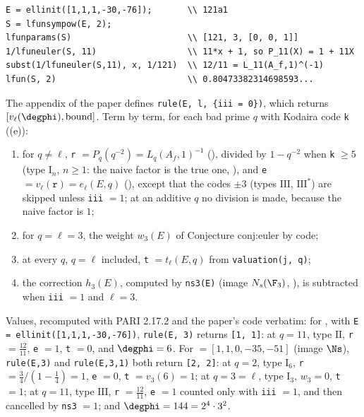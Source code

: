 \begin{lstlisting}[language=GP]
E = ellinit([1,1,1,-30,-76]);       \\ 121a1
S = lfunsympow(E, 2);
lfunparams(S)                       \\ [121, 3, [0, 0, 1]]
1/lfuneuler(S, 11)                  \\ 11*x + 1, so P_11(X) = 1 + 11X
subst(1/lfuneuler(S,11), x, 1/121)  \\ 12/11 = L_11(A_f,1)^(-1)
lfun(S, 2)                          \\ 0.80473382314698593...
\end{lstlisting}

\begin{example}\label{ex:lfunctions:rule}
The appendix of the paper defines \texttt{rule(E, l, \{iii = 0\})}, which returns $[v_\ell(\degphi),\text{bound}]$. Term by term, for each bad prime $q$ with Kodaira code \texttt{k}
((e)):
\begin{enumerate}[label=(\alph*)]
\item for $q\ne\ell$, \texttt{r} $=P_q(q^{-2})=L_q(A_f,1)^{-1}$ (), divided by $1-q^{-2}$ when \texttt{k} $\ge5$ (type $\mathrm I_n$, $n\ge1$: the naive factor is the true one,
), and \texttt{e} $=v_\ell(\texttt r)=e_\ell(E,q)$ (), except that the codes $\pm3$ (types $\mathrm{III}$, $\mathrm{III}^*$) are
skipped unless \texttt{iii} $=1$; at an additive $q$ no division is made, because the naive factor is $1$;
\item for $q=\ell=3$, the weight $w_3(E)$ of Conjecture conj:euler by code;
\item at every $q$, $q=\ell$ included, \texttt{t} $=t_\ell(E,q)$ from \texttt{valuation(j, q)};
\item the correction $h_3(E)$, computed by \texttt{ns3(E)} (image $N_s(\F_3)$, ), is subtracted when \texttt{iii} $=1$ and $\ell=3$.
\end{enumerate}
Values, recomputed with PARI 2.17.2 and the paper's code verbatim: for , with \texttt{E = ellinit([1,1,1,-30,-76])}, \texttt{rule(E,~3)} returns \texttt{[1,~1]}: at $q=11$, type $\mathrm{II}$,
\texttt{r} $=\frac{12}{11}$, \texttt{e} $=1$, \texttt{t} $=0$, and $\degphi=6$. For  $=[1,1,0,-35,-51]$ (image $\Ns$), \texttt{rule(E,3)} and \texttt{rule(E,3,1)} both return
\texttt{[2, 2]}: at $q=2$, type $\mathrm I_6$, \texttt{r} $=\frac34/(1-\frac14)=1$, \texttt{e} $=0$, \texttt{t} $=v_3(6)=1$; at $q=3=\ell$, type $\mathrm I_3$, $w_3=0$, \texttt{t} $=1$; at $q=11$, type
$\mathrm{III}$, \texttt{r} $=\frac{12}{11}$, \texttt{e} $=1$ counted only with \texttt{iii} $=1$, and then cancelled by \texttt{ns3} $=1$; and $\degphi=144=2^4\cdot3^2$.
\end{example}

